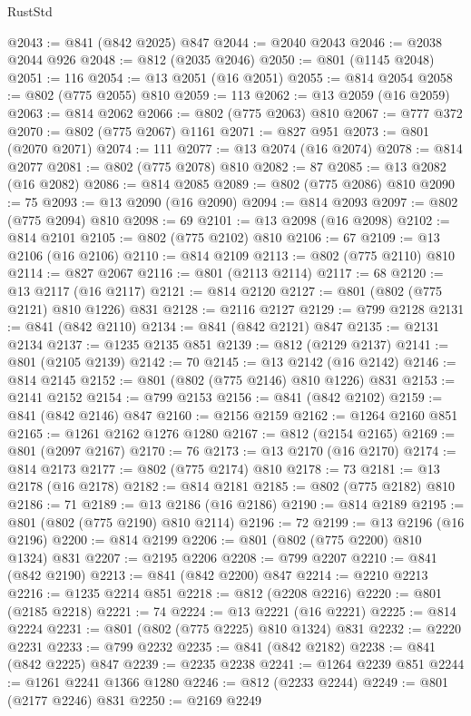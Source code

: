 \begin{lexlean}{RustStd}
\begin{coremodule}
{\begin{coremodule}
{{{{{@2043 := @841 (@842 @2025) @847
@2044 := @2040 @2043
@2046 := @2038 @2044 @926
@2048 := @812 (@2035 @2046)
@2050 := @801 (@1145 @2048)
@2051 := 116
@2054 := @13 @2051 (@16 @2051)
@2055 := @814 @2054
@2058 := @802 (@775 @2055) @810
@2059 := 113
@2062 := @13 @2059 (@16 @2059)
@2063 := @814 @2062
@2066 := @802 (@775 @2063) @810
@2067 := @777 @372
@2070 := @802 (@775 @2067) @1161
@2071 := @827 @951
@2073 := @801 (@2070 @2071)
@2074 := 111
@2077 := @13 @2074 (@16 @2074)
@2078 := @814 @2077
@2081 := @802 (@775 @2078) @810
@2082 := 87
@2085 := @13 @2082 (@16 @2082)
@2086 := @814 @2085
@2089 := @802 (@775 @2086) @810
@2090 := 75
@2093 := @13 @2090 (@16 @2090)
@2094 := @814 @2093
@2097 := @802 (@775 @2094) @810
@2098 := 69
@2101 := @13 @2098 (@16 @2098)
@2102 := @814 @2101
@2105 := @802 (@775 @2102) @810
@2106 := 67
@2109 := @13 @2106 (@16 @2106)
@2110 := @814 @2109
@2113 := @802 (@775 @2110) @810
@2114 := @827 @2067
@2116 := @801 (@2113 @2114)
@2117 := 68
@2120 := @13 @2117 (@16 @2117)
@2121 := @814 @2120
@2127 := @801 (@802 (@775 @2121) @810 @1226) @831
@2128 := @2116 @2127
@2129 := @799 @2128
@2131 := @841 (@842 @2110)
@2134 := @841 (@842 @2121) @847
@2135 := @2131 @2134
@2137 := @1235 @2135 @851
@2139 := @812 (@2129 @2137)
@2141 := @801 (@2105 @2139)
@2142 := 70
@2145 := @13 @2142 (@16 @2142)
@2146 := @814 @2145
@2152 := @801 (@802 (@775 @2146) @810 @1226) @831
@2153 := @2141 @2152
@2154 := @799 @2153
@2156 := @841 (@842 @2102)
@2159 := @841 (@842 @2146) @847
@2160 := @2156 @2159
@2162 := @1264 @2160 @851
@2165 := @1261 @2162 @1276 @1280
@2167 := @812 (@2154 @2165)
@2169 := @801 (@2097 @2167)
@2170 := 76
@2173 := @13 @2170 (@16 @2170)
@2174 := @814 @2173
@2177 := @802 (@775 @2174) @810
@2178 := 73
@2181 := @13 @2178 (@16 @2178)
@2182 := @814 @2181
@2185 := @802 (@775 @2182) @810
@2186 := 71
@2189 := @13 @2186 (@16 @2186)
@2190 := @814 @2189
@2195 := @801 (@802 (@775 @2190) @810 @2114)
@2196 := 72
@2199 := @13 @2196 (@16 @2196)
@2200 := @814 @2199
@2206 := @801 (@802 (@775 @2200) @810 @1324) @831
@2207 := @2195 @2206
@2208 := @799 @2207
@2210 := @841 (@842 @2190)
@2213 := @841 (@842 @2200) @847
@2214 := @2210 @2213
@2216 := @1235 @2214 @851
@2218 := @812 (@2208 @2216)
@2220 := @801 (@2185 @2218)
@2221 := 74
@2224 := @13 @2221 (@16 @2221)
@2225 := @814 @2224
@2231 := @801 (@802 (@775 @2225) @810 @1324) @831
@2232 := @2220 @2231
@2233 := @799 @2232
@2235 := @841 (@842 @2182)
@2238 := @841 (@842 @2225) @847
@2239 := @2235 @2238
@2241 := @1264 @2239 @851
@2244 := @1261 @2241 @1366 @1280
@2246 := @812 (@2233 @2244)
@2249 := @801 (@2177 @2246) @831
@2250 := @2169 @2249
}}}}}
\end{coremodule}}
\end{coremodule}
\end{lexlean}
